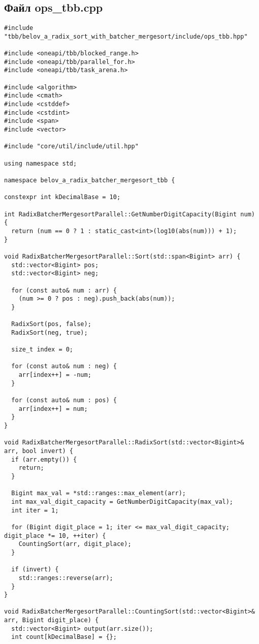 \documentclass[a4paper,12pt]{article}
\begin{document}
\subsection*{Файл ops\_tbb.cpp}
\begin{lstlisting}
#include "tbb/belov_a_radix_sort_with_batcher_mergesort/include/ops_tbb.hpp"

#include <oneapi/tbb/blocked_range.h>
#include <oneapi/tbb/parallel_for.h>
#include <oneapi/tbb/task_arena.h>

#include <algorithm>
#include <cmath>
#include <cstddef>
#include <cstdint>
#include <span>
#include <vector>

#include "core/util/include/util.hpp"

using namespace std;

namespace belov_a_radix_batcher_mergesort_tbb {

constexpr int kDecimalBase = 10;

int RadixBatcherMergesortParallel::GetNumberDigitCapacity(Bigint num) {
  return (num == 0 ? 1 : static_cast<int>(log10(abs(num))) + 1);
}

void RadixBatcherMergesortParallel::Sort(std::span<Bigint> arr) {
  std::vector<Bigint> pos;
  std::vector<Bigint> neg;

  for (const auto& num : arr) {
    (num >= 0 ? pos : neg).push_back(abs(num));
  }

  RadixSort(pos, false);
  RadixSort(neg, true);

  size_t index = 0;

  for (const auto& num : neg) {
    arr[index++] = -num;
  }

  for (const auto& num : pos) {
    arr[index++] = num;
  }
}

void RadixBatcherMergesortParallel::RadixSort(std::vector<Bigint>& arr, bool invert) {
  if (arr.empty()) {
    return;
  }

  Bigint max_val = *std::ranges::max_element(arr);
  int max_val_digit_capacity = GetNumberDigitCapacity(max_val);
  int iter = 1;

  for (Bigint digit_place = 1; iter <= max_val_digit_capacity; digit_place *= 10, ++iter) {
    CountingSort(arr, digit_place);
  }

  if (invert) {
    std::ranges::reverse(arr);
  }
}

void RadixBatcherMergesortParallel::CountingSort(std::vector<Bigint>& arr, Bigint digit_place) {
  std::vector<Bigint> output(arr.size());
  int count[kDecimalBase] = {};


\end{lstlisting}
\end{document}
